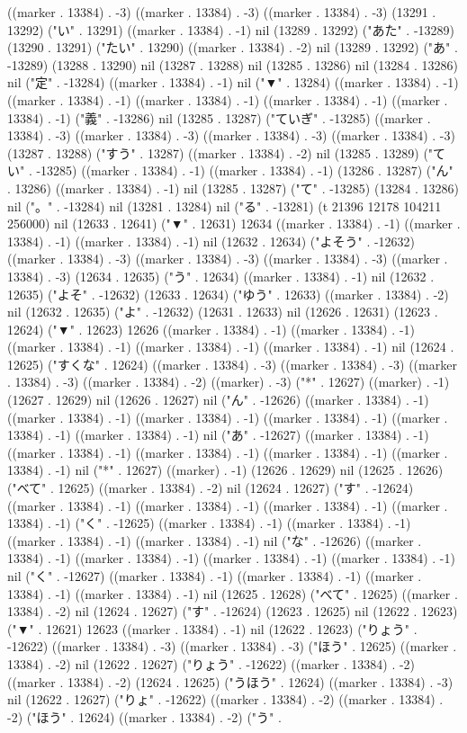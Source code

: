 ((marker . 13384) . -3) ((marker . 13384) . -3) ((marker . 13384) . -3) (13291 . 13292) ("い" . 13291) ((marker . 13384) . -1) nil (13289 . 13292) ("あた" . -13289) (13290 . 13291) ("たい" . 13290) ((marker . 13384) . -2) nil (13289 . 13292) ("あ" . -13289) (13288 . 13290) nil (13287 . 13288) nil (13285 . 13286) nil (13284 . 13286) nil ("定" . -13284) ((marker . 13384) . -1) nil ("▼" . 13284) ((marker . 13384) . -1) ((marker . 13384) . -1) ((marker . 13384) . -1) ((marker . 13384) . -1) ((marker . 13384) . -1) ("義" . -13286) nil (13285 . 13287) ("ていぎ" . -13285) ((marker . 13384) . -3) ((marker . 13384) . -3) ((marker . 13384) . -3) ((marker . 13384) . -3) (13287 . 13288) ("すう" . 13287) ((marker . 13384) . -2) nil (13285 . 13289) ("てい" . -13285) ((marker . 13384) . -1) ((marker . 13384) . -1) (13286 . 13287) ("ん" . 13286) ((marker . 13384) . -1) nil (13285 . 13287) ("て" . -13285) (13284 . 13286) nil ("。" . -13284) nil (13281 . 13284) nil ("る" . -13281) (t 21396 12178 104211 256000) nil (12633 . 12641) ("▼" . 12631) 12634 ((marker . 13384) . -1) ((marker . 13384) . -1) ((marker . 13384) . -1) nil (12632 . 12634) ("よそう" . -12632) ((marker . 13384) . -3) ((marker . 13384) . -3) ((marker . 13384) . -3) ((marker . 13384) . -3) (12634 . 12635) ("う" . 12634) ((marker . 13384) . -1) nil (12632 . 12635) ("よそ" . -12632) (12633 . 12634) ("ゆう" . 12633) ((marker . 13384) . -2) nil (12632 . 12635) ("よ" . -12632) (12631 . 12633) nil (12626 . 12631) (12623 . 12624) ("▼" . 12623) 12626 ((marker . 13384) . -1) ((marker . 13384) . -1) ((marker . 13384) . -1) ((marker . 13384) . -1) ((marker . 13384) . -1) nil (12624 . 12625) ("すくな" . 12624) ((marker . 13384) . -3) ((marker . 13384) . -3) ((marker . 13384) . -3) ((marker . 13384) . -2) ((marker) . -3) ("*" . 12627) ((marker) . -1) (12627 . 12629) nil (12626 . 12627) nil ("ん" . -12626) ((marker . 13384) . -1) ((marker . 13384) . -1) ((marker . 13384) . -1) ((marker . 13384) . -1) ((marker . 13384) . -1) ((marker . 13384) . -1) nil ("あ" . -12627) ((marker . 13384) . -1) ((marker . 13384) . -1) ((marker . 13384) . -1) ((marker . 13384) . -1) ((marker . 13384) . -1) nil ("*" . 12627) ((marker) . -1) (12626 . 12629) nil (12625 . 12626) ("べて" . 12625) ((marker . 13384) . -2) nil (12624 . 12627) ("す" . -12624) ((marker . 13384) . -1) ((marker . 13384) . -1) ((marker . 13384) . -1) ((marker . 13384) . -1) ("く" . -12625) ((marker . 13384) . -1) ((marker . 13384) . -1) ((marker . 13384) . -1) ((marker . 13384) . -1) nil ("な" . -12626) ((marker . 13384) . -1) ((marker . 13384) . -1) ((marker . 13384) . -1) ((marker . 13384) . -1) nil ("く" . -12627) ((marker . 13384) . -1) ((marker . 13384) . -1) ((marker . 13384) . -1) ((marker . 13384) . -1) nil (12625 . 12628) ("べて" . 12625) ((marker . 13384) . -2) nil (12624 . 12627) ("す" . -12624) (12623 . 12625) nil (12622 . 12623) ("▼" . 12621) 12623 ((marker . 13384) . -1) nil (12622 . 12623) ("りょう" . -12622) ((marker . 13384) . -3) ((marker . 13384) . -3) ("ほう" . 12625) ((marker . 13384) . -2) nil (12622 . 12627) ("りょう" . -12622) ((marker . 13384) . -2) ((marker . 13384) . -2) (12624 . 12625) ("うほう" . 12624) ((marker . 13384) . -3) nil (12622 . 12627) ("りょ" . -12622) ((marker . 13384) . -2) ((marker . 13384) . -2) ("ほう" . 12624) ((marker . 13384) . -2) ("う" . 